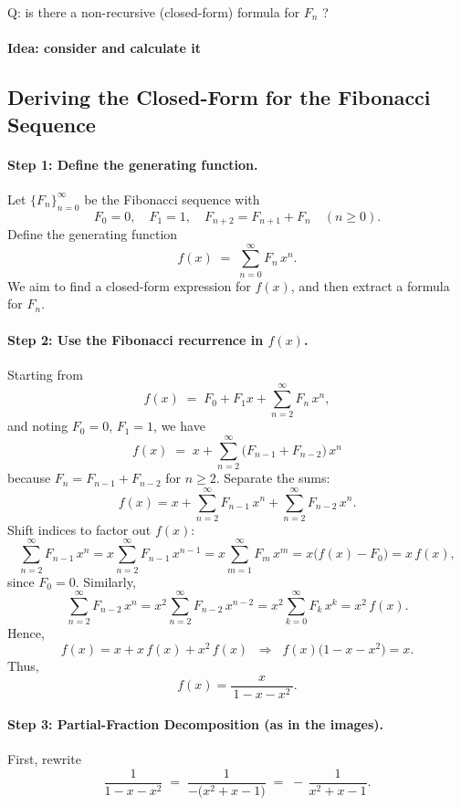 \documentclass{article}
\begin{document}
Q: is there a non-recursive (closed-form) formula for \(F_n\) ?
\paragraph{Idea: consider and calculate it}

\subsection{Deriving the Closed-Form for the Fibonacci Sequence}

\paragraph{Step 1: Define the generating function.}
Let \(\{F_n\}_{n=0}^{\infty}\) be the Fibonacci sequence with 
\[
F_0 = 0, \quad F_1 = 1, \quad F_{n+2} = F_{n+1} + F_n \quad (n \ge 0).
\]
Define the generating function
\[
f(x) \;=\; \sum_{n=0}^{\infty} F_n\,x^n.
\]
We aim to find a closed-form expression for \(f(x)\), and then extract a formula for \(F_n\).

\paragraph{Step 2: Use the Fibonacci recurrence in \(f(x)\).}
Starting from
\[
f(x) \;=\; F_0 + F_1 x + \sum_{n=2}^{\infty} F_n\,x^n,
\]
and noting \(F_0=0\), \(F_1=1\), we have
\[
f(x) \;=\; x + \sum_{n=2}^{\infty} \bigl(F_{n-1} + F_{n-2}\bigr)\,x^n
\]
because \(F_n = F_{n-1} + F_{n-2}\) for \(n\ge2\). Separate the sums:
\[
f(x)
= x
+ \sum_{n=2}^{\infty} F_{n-1}\,x^n
+ \sum_{n=2}^{\infty} F_{n-2}\,x^n.
\]
Shift indices to factor out \(f(x)\):
\[
\sum_{n=2}^{\infty} F_{n-1}\,x^n 
= x \sum_{n=2}^{\infty} F_{n-1}\,x^{n-1} 
= x \sum_{m=1}^{\infty} F_m\,x^m 
= x \bigl(f(x) - F_0\bigr) 
= x\,f(x),
\]
since \(F_0=0\). Similarly,
\[
\sum_{n=2}^{\infty} F_{n-2}\,x^n 
= x^2 \sum_{n=2}^{\infty} F_{n-2}\,x^{n-2}
= x^2 \sum_{k=0}^{\infty} F_k\,x^k
= x^2\,f(x).
\]
Hence,
\[
f(x) = x + x\,f(x) + x^2\,f(x) 
\;\;\Longrightarrow\;\;
f(x)\bigl(1 - x - x^2\bigr) = x.
\]
Thus,
\[
f(x) = \frac{x}{\,1 - x - x^2\,}.
\]

\paragraph{Step 3: Partial-Fraction Decomposition (as in the images).}

First, rewrite
\[
\frac{1}{1 - x - x^2}
\;=\;
\frac{1}{-\bigl(x^2 + x - 1\bigr)}
\;=\;
-\,\frac{1}{x^2 + x - 1}.
\]
\end{document}

